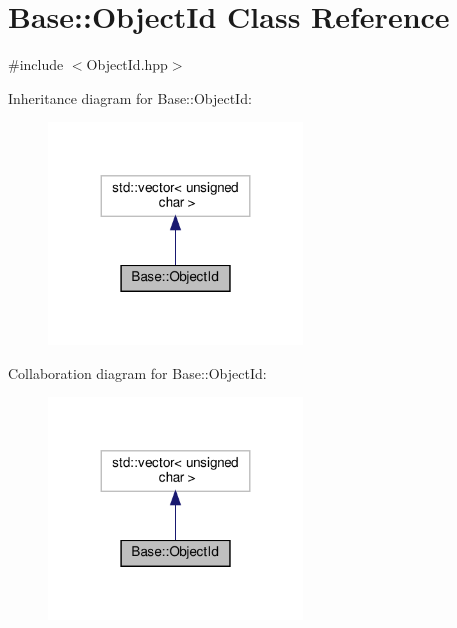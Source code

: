\hypertarget{class_base_1_1_object_id}{}\section{Base\+:\+:Object\+Id Class Reference}
\label{class_base_1_1_object_id}


{\ttfamily \#include $<$Object\+Id.\+hpp$>$}



Inheritance diagram for Base\+:\+:Object\+Id\+:
\nopagebreak
\begin{figure}[H]
\begin{center}
\leavevmode
\includegraphics[width=191pt]{class_base_1_1_object_id__inherit__graph}
\end{center}
\end{figure}


Collaboration diagram for Base\+:\+:Object\+Id\+:
\nopagebreak
\begin{figure}[H]
\begin{center}
\leavevmode
\includegraphics[width=191pt]{class_base_1_1_object_id__coll__graph}
\end{center}
\end{figure}
